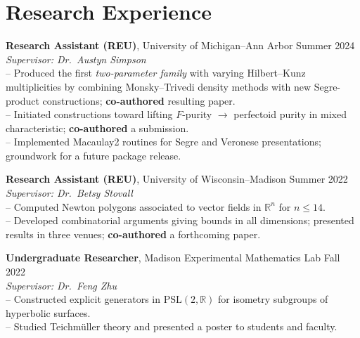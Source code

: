 \documentclass[11pt, a4paper]{article}
\newcommand{\sectionsep}{\vspace{0.28cm}}
\begin{document}
\sectionsep

\section*{Research Experience}
\textbf{Research Assistant (REU)}, University of Michigan–Ann Arbor \hfill Summer 2024\\
\textit{Supervisor: Dr.~Austyn Simpson}\\
– Produced the first \textit{two-parameter family} with varying Hilbert–Kunz multiplicities by combining Monsky–Trivedi density methods with new Segre-product constructions; \textbf{co-authored} resulting paper.\\
– Initiated constructions toward lifting \(F\)-purity \(\to\) perfectoid purity in mixed characteristic; \textbf{co-authored} a submission.\\
– Implemented Macaulay2 routines for Segre and Veronese presentations; groundwork for a future package release.

\vspace{0.12cm}
\noindent\textbf{Research Assistant (REU)}, University of Wisconsin–Madison \hfill Summer 2022\\
\textit{Supervisor: Dr.~Betsy Stovall}\\
– Computed Newton polygons associated to vector fields in \(\mathbb{R}^n\) for \(n\le14\).\\
– Developed combinatorial arguments giving bounds in all dimensions; presented results in three venues; \textbf{co-authored} a forthcoming paper.

\vspace{0.12cm}
\noindent\textbf{Undergraduate Researcher}, Madison Experimental Mathematics Lab \hfill Fall 2022\\
\textit{Supervisor: Dr.~Feng Zhu}\\
– Constructed explicit generators in \(\mathrm{PSL}(2,\mathbb{R})\) for isometry subgroups of hyperbolic surfaces.\\
– Studied Teichmüller theory and presented a poster to students and faculty.

\sectionsep

\end{document}
